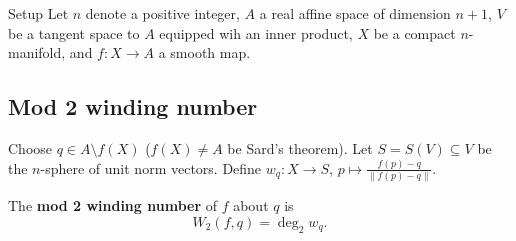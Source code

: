 \begin{namedthing}{Setup} 
   Let $n$ denote a positive integer, $A$ a real affine space of dimension $n+1$, $V$ be a tangent space to $A$ equipped wih an inner product, $X$ be a compact $n$-manifold, and $f \colon X \to A$ a smooth map. 
\end{namedthing}
\subsection{Mod 2 winding number}
Choose $q \in A \setminus f(X)$ ($f(X)\neq A$ be Sard's theorem). Let $S=S(V)\subseteq V$ be the $n$-sphere of unit norm vectors. Define $w_q \colon X \to S$, $p \mapsto  \frac{f(p)-q}{\|f(p)-q\|}.$
\begin{definition}[]
    The \textbf{mod 2 winding number} of $f$ about $q$ is \[
        W_2(f,q)=\deg_2w_q.
    \] 
\end{definition}
